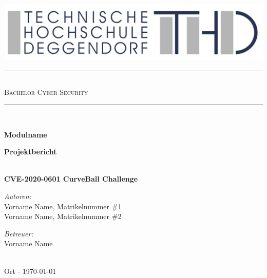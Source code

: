 \documentclass{article}
\begin{document}

\begin{titlepage}
	\begin{center}
		
        \includegraphics[width=\textwidth]{THD-Logo.pdf}
	
	    \vspace{1cm}
	
		\rule{1\textwidth}{1mm} \\[0.3cm]

		\textsc{\scshape \huge Bachelor Cyber Security}\\
		
		\rule{1\textwidth}{1mm} \\[2cm] 
		
		{ 
			 \vspace{1cm}
			 
			 \Large \textbf{Modulname}
			 
			 \vspace{3cm}
			 \Large \textbf{Projektbericht}}\\[0.5cm]
			 \LARGE \textbf{CVE-2020-0601 CurveBall Challenge}\\[2cm]
		\begin{minipage}[t]{0.4\textwidth}
			\begin{flushleft} \normalsize
				\emph{Autoren:}\\[0.3cm]
				
			    Vorname Name, Matrikelnummer \#1\\
			    Vorname Name, Matrikelnummer \#2\\
				
			\end{flushleft}
		\end{minipage}
		\begin{minipage}[t]{0.5\textwidth}
			\begin{flushright} \normalsize
				\emph{Betreuer:}\\[0.3cm]
				
    			Vorname Name 
				
			\end{flushright}
		\end{minipage}\\[3cm]
		{\large Ort - \today\\}	
		\vspace{3cm}
	\end{center}
\end{titlepage}
\end{document}
